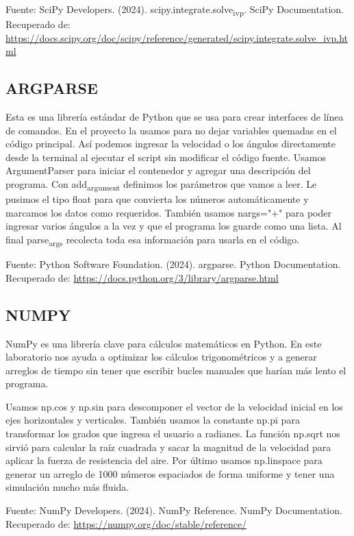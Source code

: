 \documentclass{article}
\begin{document}
Fuente: SciPy Developers. (2024). scipy.integrate.solve\textsubscript{ivp}. SciPy Documentation. Recuperado de: \url{https://docs.scipy.org/doc/scipy/reference/generated/scipy.integrate.solve\_ivp.html}

\subsection{ARGPARSE}
\label{sec:org9da81ee}

Esta es una librería estándar de Python que se usa para crear
 interfaces de línea de comandos. En el proyecto la usamos para no
 dejar variables quemadas en el código principal.
 Así podemos ingresar la velocidad o los ángulos directamente desde la
 terminal al ejecutar el script sin modificar el código fuente.
 Usamos ArgumentParser para iniciar el contenedor y agregar una
 descripción del programa. Con add\textsubscript{argument} definimos los parámetros
 que vamos a leer.
 Le pusimos el tipo float para que convierta los números
 automáticamente y marcamos los datos como requeridos.
 También usamos nargs="+" para poder ingresar varios ángulos a la vez y que el programa los guarde como una lista. Al final parse\textsubscript{args} recolecta toda esa información para usarla en el código.

Fuente: Python Software Foundation. (2024). argparse. Python
Documentation. Recuperado de:
\url{https://docs.python.org/3/library/argparse.html}

\subsection{NUMPY}
\label{sec:org60eb01e}

NumPy es una librería clave para cálculos matemáticos en Python. En este laboratorio nos ayuda a optimizar los cálculos trigonométricos y a generar arreglos de tiempo sin tener que escribir bucles manuales que harían más lento el programa.

Usamos np.cos y np.sin para descomponer el vector de la velocidad inicial en los ejes horizontales y verticales. También usamos la constante np.pi para transformar los grados que ingresa el usuario a radianes. La función np.sqrt nos sirvió para calcular la raíz cuadrada y sacar la magnitud de la velocidad para aplicar la fuerza de resistencia del aire. Por último usamos np.linspace para generar un arreglo de 1000 números espaciados de forma uniforme y tener una simulación mucho más fluida.

Fuente: NumPy Developers. (2024). NumPy Reference. NumPy Documentation. Recuperado de: \url{https://numpy.org/doc/stable/reference/}
\end{document}
